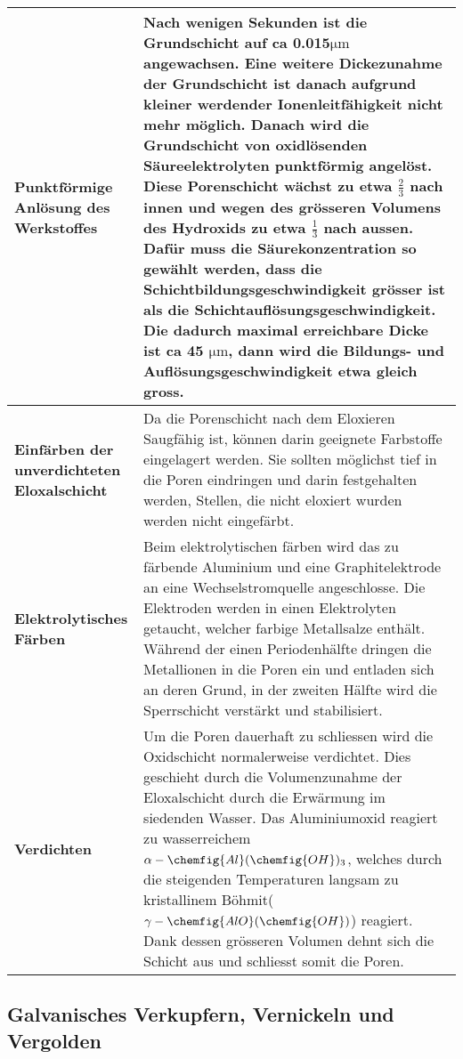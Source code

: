 \begin{longtable}{p{3cm}p{14cm}}
	\hline
	\textbf{Punktförmige Anlösung des Werkstoffes}
		& Nach wenigen Sekunden ist die Grundschicht auf ca 0.015$\mathrm{\mu m}$ angewachsen. Eine weitere Dickezunahme der Grundschicht ist danach aufgrund kleiner werdender Ionenleitfähigkeit nicht mehr möglich. Danach wird die Grundschicht von oxidlösenden Säureelektrolyten punktförmig angelöst. Diese Porenschicht wächst zu etwa $\frac{2}{3}$ nach innen und wegen des grösseren Volumens des Hydroxids zu etwa $\frac{1}{3}$ nach aussen. Dafür muss die Säurekonzentration so gewählt werden, dass die Schichtbildungsgeschwindigkeit grösser ist als die Schichtauflösungsgeschwindigkeit. Die dadurch maximal erreichbare Dicke ist ca 45 $\mathrm{\mu m}$, dann wird die Bildungs- und Auflösungsgeschwindigkeit etwa gleich gross.\\
	\hline
	\textbf{Einfärben der unverdichteten Eloxalschicht}
		& Da die Porenschicht nach dem Eloxieren Saugfähig ist, können darin geeignete Farbstoffe eingelagert werden. Sie sollten möglichst tief in die Poren eindringen und darin festgehalten werden, Stellen, die nicht eloxiert wurden werden nicht eingefärbt.\\
	\hline
	\textbf{Elektrolytisches Färben}
		& Beim elektrolytischen färben wird das zu färbende Aluminium und eine Graphitelektrode an eine Wechselstromquelle angeschlosse. Die Elektroden werden in einen Elektrolyten getaucht, welcher farbige Metallsalze enthält. Während der einen Periodenhälfte dringen die Metallionen in die Poren ein und entladen sich an deren Grund, in der zweiten Hälfte wird die Sperrschicht verstärkt und stabilisiert.\\
	\hline
	\textbf{Verdichten}
		& Um die Poren dauerhaft zu schliessen wird die Oxidschicht normalerweise verdichtet. Dies geschieht durch die Volumenzunahme der Eloxalschicht durch die Erwärmung im siedenden Wasser. Das Aluminiumoxid reagiert zu wasserreichem $\alpha-\chemfig{Al}(\chemfig{OH})_3$, welches durch die steigenden Temperaturen langsam zu kristallinem Böhmit($\gamma-\chemfig{AlO}(\chemfig{OH})$) reagiert. Dank dessen grösseren Volumen dehnt sich die Schicht aus und schliesst somit die Poren.
\end{longtable}

\subsection{Galvanisches Verkupfern, Vernickeln und Vergolden}

